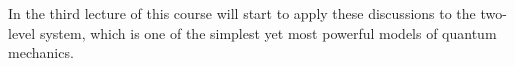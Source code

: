 In the \href{http://}{}third lecture of this course will start to apply these discussions to the two-level system, which is one of the simplest yet most powerful models of quantum mechanics.